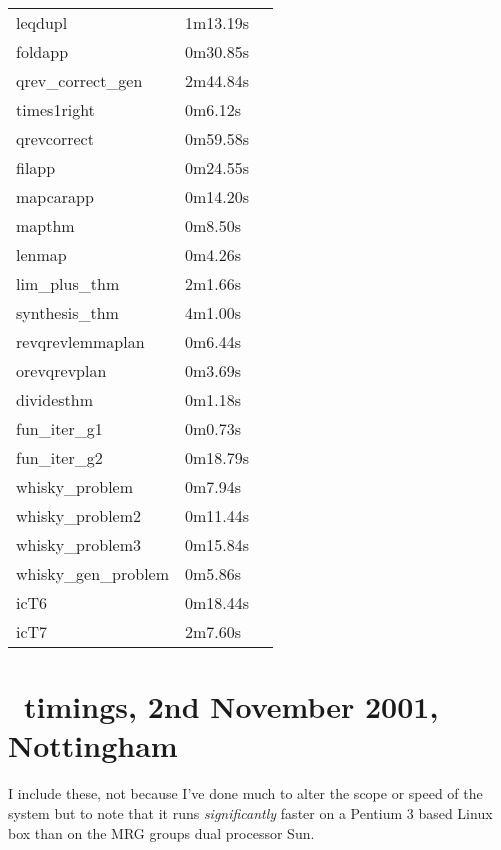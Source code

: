 \begin{center}
\begin{supertabular}[t]{llp{2in}}
leqdupl & 1m13.19s & \\
foldapp & 0m30.85s & \\
qrev\_correct\_gen & 2m44.84s & \\
times1right & 0m6.12s & \\
qrevcorrect & 0m59.58s & \\
filapp & 0m24.55s & \\
mapcarapp & 0m14.20s & \\
mapthm & 0m8.50s & \\
lenmap & 0m4.26s & \\
lim\_plus\_thm & 2m1.66s & \\
synthesis\_thm & 4m1.00s & \\
revqrevlemmaplan & 0m6.44s & \\
orevqrevplan & 0m3.69s & \\
dividesthm & 0m1.18s & \\
fun\_iter\_g1 & 0m0.73s & \\
fun\_iter\_g2 & 0m18.79s & \\
whisky\_problem & 0m7.94s & \\
whisky\_problem2 & 0m11.44s & \\
whisky\_problem3 & 0m15.84s & \\
whisky\_gen\_problem & 0m5.86s & \\
icT6 & 0m18.44s & \\
icT7 & 2m7.60s & \\
\end{supertabular}\end{center}

\section{\lclam\ timings, 2nd November 2001, Nottingham}
I include these, not because I've done much to alter the scope or speed of the system but to note that it runs {\em significantly} faster on a Pentium 3 based Linux box than on the MRG groups dual processor Sun.

